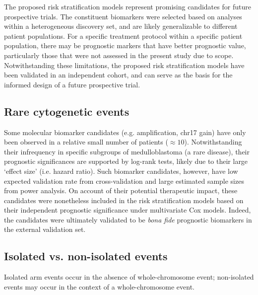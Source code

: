 The proposed risk stratification models represent promising candidates for future prospective trials. The constituent biomarkers were selected based on analyses within a heterogeneous discovery set, and are likely generalizable to different patient populations. For a specific treatment protocol within a specific patient population, there may be prognostic markers that have better prognostic value, particularly those that were not assessed in the present study due to scope. Notwithstanding these limitations, the proposed risk stratification models have been validated in an independent cohort, and can serve as the basis for the informed design of a future prospective trial.

\subsection{Rare cytogenetic events}

Some molecular biomarker candidates (e.g.  amplification, chr17 gain) have only been observed in a relative small number of patients ($\approx 10$). Notwithstanding their infrequency in specific subgroups of medulloblastoma (a rare disease), their prognostic significances are supported by log-rank tests, likely due to their large `effect size' (i.e. hazard ratio). Such biomarker candidates, however, have low expected validation rate from cross-validation and large estimated sample sizes from power analysis. On account of their potential therapeutic impact, these candidates were nonetheless included in the risk stratification models based on their independent prognostic significance under multivariate Cox models. Indeed, the candidates were ultimately validated to be \emph{bona fide} prognostic biomarkers in the external validation set.

\subsection{Isolated vs. non-isolated events}

Isolated arm events occur in the absence of whole-chromosome event; non-isolated events may occur in the context of a whole-chromosome event.



